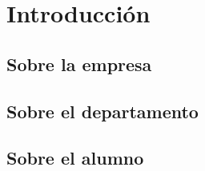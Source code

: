 \chapter{Introducción}
\section{Sobre la empresa}

\section{Sobre el departamento}

\section{Sobre el alumno}
